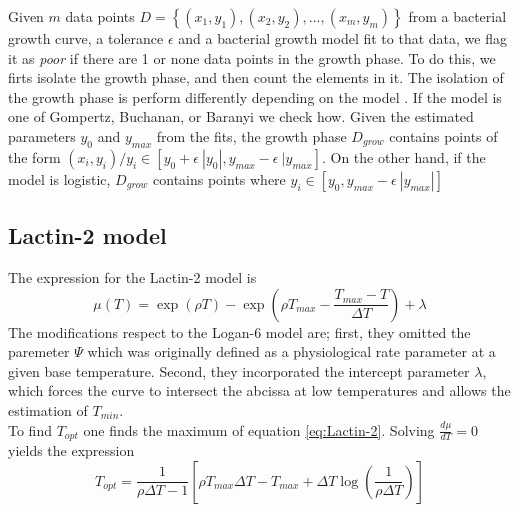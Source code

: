 \documentclass[titlepage,11pt]{article}
\begin{document}
\begin{linenumbers}
	Given $ m $ data points $ D =  \left\{(x_1, y_1), (x_2, y_2), ... , (x_m, y_m)\right\} $ from a bacterial growth curve, a tolerance $ \epsilon $ and a bacterial growth model fit to that data, we flag it as \textit{poor} if there are 1 or none data points in the growth phase. To do this, we firts isolate the growth phase, and then count the elements in it. The isolation of the growth phase is perform differently depending on the model . 
	If the model is one of Gompertz, Buchanan, or Baranyi we check how. Given the estimated parameters $ y_{0} $ and $ y_{max} $ from the fits, the growth phase $D_{grow} $ contains points of the form $ (x_i, y_i) / y_i \in [y_0 + \epsilon\ |y_0| , y_{max} - \epsilon \ |y_{max}]$. On the other hand, if the model is logistic, $ D_{grow} $ contains points where $ y_i \in [y_0, y_{max}-\epsilon \ |y_{max}|] $
	
	\subsection{Lactin-2 model}\label{subsec:Lactin-2}
	The expression for the Lactin-2 model is 
	\begin{equation}\label{eq:Lactin-2}
		\mu(T) = \exp(\rho T) - \exp\left(\rho T_{max} - \frac{T_{max}-T}{\Delta T}\right) + \lambda	
	\end{equation}
	The modifications respect to the Logan-6 model are; first, they omitted the paremeter $ \Psi $ which was originally defined as a physiological rate parameter at a given base temperature. Second, they incorporated the intercept parameter $ \lambda $, which forces the curve to intersect the abcissa at low temperatures and allows the estimation of $ T_{min} $.\\
	To find $ T_{opt} $ one finds the maximum of equation \ref{eq:Lactin-2}. Solving $ \frac{d\mu}{dT}  = 0$ yields the expression
	\begin{equation}\label{eq:Topt}
		T_{opt} = \frac{1}{\rho\Delta T  -1}\left[\rho T_{max} \Delta T - T_{max} + \Delta T \log\left(\frac{1}{\rho\Delta T }\right) \right]
	\end{equation}\\
\end{linenumbers}
\newpage


\end{document}
